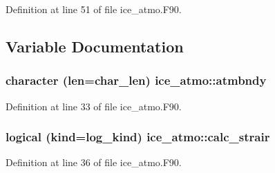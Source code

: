 Definition at line 51 of file ice\_\-atmo.F90.

\subsection{Variable Documentation}
\hypertarget{namespaceice__atmo_aae4bd7119f41531a5beba8ea5f03c805}{
\subsubsection[{atmbndy}]{\setlength{\rightskip}{0pt plus 5cm}character (len=char\_\-len) {\bf ice\_\-atmo::atmbndy}}}
\label{namespaceice__atmo_aae4bd7119f41531a5beba8ea5f03c805}


Definition at line 33 of file ice\_\-atmo.F90.\hypertarget{namespaceice__atmo_a114305e959bca27e073f74995bf55855}{
\subsubsection[{calc\_\-strair}]{\setlength{\rightskip}{0pt plus 5cm}logical (kind=log\_\-kind) {\bf ice\_\-atmo::calc\_\-strair}}}
\label{namespaceice__atmo_a114305e959bca27e073f74995bf55855}


Definition at line 36 of file ice\_\-atmo.F90.